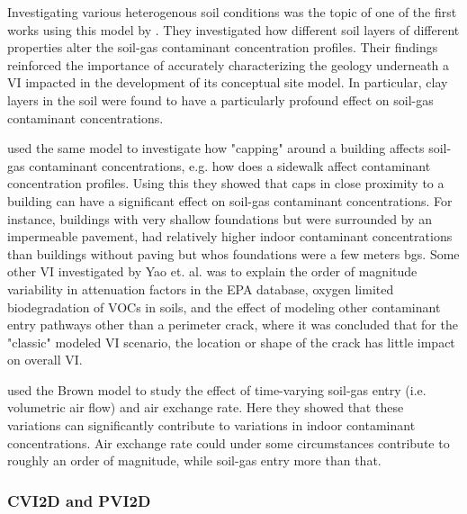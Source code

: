 Investigating various heterogenous soil conditions was the topic of one of the first works using this model by \citeauthor{bozkurt_simulation_2009}\cite{bozkurt_simulation_2009}.
They investigated how different soil layers of different properties alter the soil-gas contaminant concentration profiles.
Their findings reinforced the importance of accurately characterizing the geology underneath a VI impacted in the development of its conceptual site model.
In particular, clay layers in the soil were found to have a particularly profound effect on soil-gas contaminant concentrations.\par

\citeauthor{yao_vapor_2011}\cite{yao_vapor_2011} used the same model to investigate how "capping" around a building affects soil-gas contaminant concentrations, e.g. how does a sidewalk affect contaminant concentration profiles.
Using this they showed that caps in close proximity to a building can have a significant effect on soil-gas contaminant concentrations.
For instance, buildings with very shallow foundations but were surrounded by an impermeable pavement, had relatively higher indoor contaminant concentrations than buildings without paving but whos foundations were a few meters bgs.
Some other VI investigated by Yao et. al. was to explain the order of magnitude variability in attenuation factors in the EPA database\cite{yao_examination_2013-1}, oxygen limited biodegradation of VOCs in soils\cite{yao_estimation_2014}, and the effect of modeling other contaminant entry pathways other than a perimeter crack\cite{yao_simulating_2013}, where it was concluded that for the "classic" modeled VI scenario, the location or shape of the crack has little impact on overall VI.\par

\citeauthor{shen_impacts_2016}\cite{shen_impacts_2016} used the Brown model to study the effect of time-varying soil-gas entry (i.e. volumetric air flow) and air exchange rate.
Here they showed that these variations can significantly contribute to variations in indoor contaminant concentrations.
Air exchange rate could under some circumstances contribute to roughly an order of magnitude, while soil-gas entry more than that.\par

\subsubsection{CVI2D and PVI2D}

